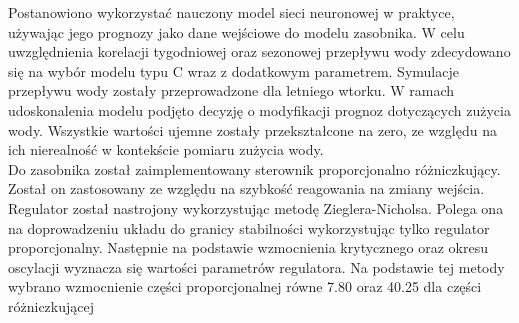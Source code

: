 \documentclass[a4paper,twoside,12pt]{book}
\begin{document}
Postanowiono wykorzystać nauczony model sieci neuronowej w praktyce, używając jego prognozy jako dane wejściowe do modelu zasobnika. W celu uwzględnienia korelacji tygodniowej oraz sezonowej przepływu wody zdecydowano się na wybór modelu typu C wraz z dodatkowym parametrem. Symulacje przepływu wody zostały przeprowadzone dla letniego wtorku. W ramach udoskonalenia modelu podjęto decyzję o modyfikacji prognoz dotyczących zużycia wody. Wszystkie wartości ujemne zostały przekształcone na zero, ze względu na ich nierealność w kontekście pomiaru zużycia wody.\\

Do zasobnika został zaimplementowany sterownik proporcjonalno różniczkujący. Został on zastosowany ze względu na szybkość reagowania na zmiany wejścia. Regulator został nastrojony wykorzystując metodę Zieglera-Nicholsa. Polega ona na doprowadzeniu układu do granicy stabilności wykorzystując tylko regulator proporcjonalny. Następnie na podstawie wzmocnienia krytycznego oraz okresu oscylacji wyznacza się wartości parametrów regulatora. Na podstawie tej metody wybrano wzmocnienie części proporcjonalnej równe 7.80 oraz 40.25 dla części różniczkującej
\end{document}
